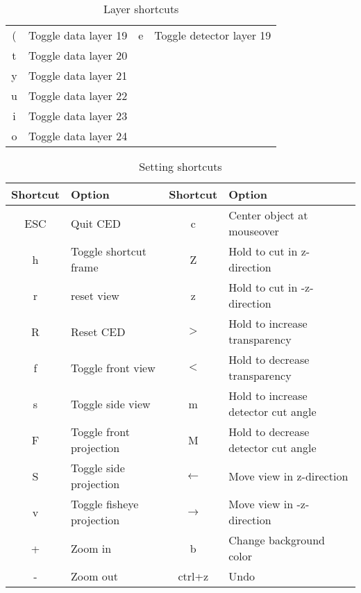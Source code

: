 \documentclass[a4paper,10pt]{article}
\begin{document}
\begin{center}
\begin{table}
\begin{tabular}[ht]{|c|l||c|l|}
  ( & Toggle data layer 19                 &e   & Toggle detector layer 19\\
  t & Toggle data layer 20                 & &\\
  y & Toggle data layer 21                 & &\\
  u & Toggle data layer 22                 & &\\
  i & Toggle data layer 23                 & &\\
  o & Toggle data layer 24                 & &\\
  \hline
\end{tabular}
\caption{Layer shortcuts}
\label{layershortcuts}
\end{table}
\end{center}

\begin{center}
\begin{table}
 \begin{tabular}[ht]{|c|l||c|l|}
  \hline
  Shortcut & Option & Shortcut & Option\\
  \hline\hline
ESC & Quit CED                        &c   & Center object at mouseover          \\ 
h   & Toggle shortcut frame           &Z   & Hold to cut in z-direction          \\ 
r   & reset view                      &z   & Hold to cut in -z-direction         \\ 
R   & Reset CED                       &$>$   & Hold to increase transparency       \\ 
f   & Toggle front view               &$<$   & Hold to decrease transparency       \\ 
s   & Toggle side view                &m   & Hold to increase detector cut angle \\ 
F   & Toggle front projection         &M   & Hold to decrease detector cut angle \\ 
S   & Toggle side projection          &$\leftarrow$  & Move view in z-direction            \\ 
v   & Toggle fisheye projection       &$\rightarrow$  & Move view in -z-direction           \\ 
+   & Zoom in                         &b   & Change background color             \\ 
-   & Zoom out                        & ctrl+z & Undo                            \\                     
\hline
\end{tabular}
\label{controlshortcuts}
\caption{Setting shortcuts}
\end{table}
\end{center}
\end{document}
